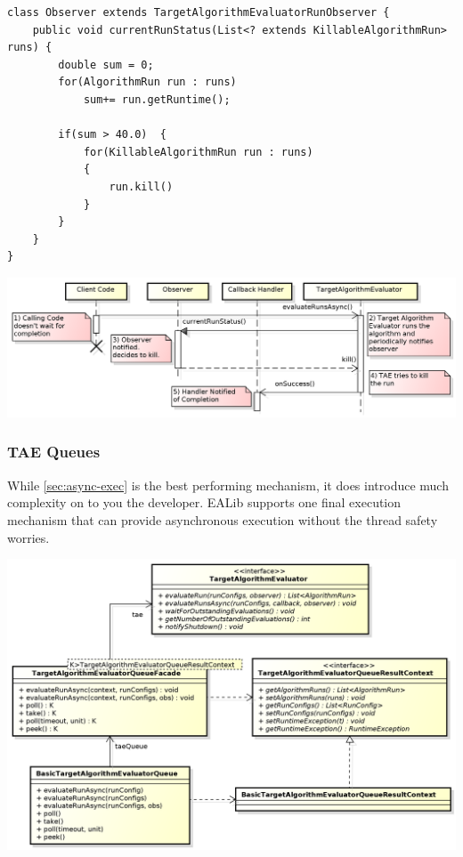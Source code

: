 \documentclass[11pt,letterpaper,oneside]{article}
\begin{document}
\begin{center}
\begin{lstlisting}[]
class Observer extends TargetAlgorithmEvaluatorRunObserver {
	public void currentRunStatus(List<? extends KillableAlgorithmRun> runs) {
		double sum = 0;
		for(AlgorithmRun run : runs)
			sum+= run.getRuntime();
		
		if(sum > 40.0)	{
			for(KillableAlgorithmRun run : runs)
			{
				run.kill()
			}
		}
	}
}

\end{lstlisting}
\end{center}




\begin{center}
\includegraphics[scale=0.5]{img/UML/TAESequence3.png}
\end{center}


\subsubsection{TAE Queues}

While \ref{sec:async-exec} is the best performing mechanism, it does introduce much complexity 
on to you the developer. EALib supports one final execution mechanism that can provide asynchronous execution without the thread safety worries.

\begin{center}
\includegraphics[scale=0.60]{img/UML/TAEQueue.png}
\end{center}
\end{document}
